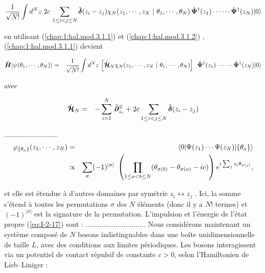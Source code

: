 {{\begin{eqnarray}
	 \frac{1}{ \sqrt{N!}} \int d^N z \,  \,2	c \,\sum_{1\leq i<j\leq N} \hat{\bm{\delta}}(z_i - z_j) \chi_N ( z_1 , \cdots , z_N  ~\vert ~ \theta_1 , \cdots , \theta _N ) \, \hat{\bm{\Psi}}^\dag(z_1) \cdots  \cdots\hat{\bm{\Psi}}^\dag(z_N) \vert 0 \rangle \label{chap:1:hal.mod.3.1.2}	
\end{eqnarray} 

en utilisant (\ref{chap:1:hal.mod.3.1.1}) et (\ref{chap:1:hal.mod.3.1.2}) , (\ref{chap:1:hal.mod.3.1.1}) devient 

\begin{eqnarray}
	\operator{H}\vert \psi ( \theta_1 , \cdots , \theta_N ) \rangle &= &  \frac{1}{ \sqrt{N!}} \int d^N z \,  	\left [ \operator{\mathcal{H}}_N \chi_N ( z_1 , \cdots , z_N  ~\vert ~ \theta_1 , \cdots , \theta _N ) \right ] \, \operator{\Psi}^\dag(z_1) \cdots  \cdots\operator{\Psi}^\dag(z_N) \vert 0 \rangle		
\end{eqnarray}

avec 

\begin{eqnarray}
	\hat{\bm{\mathcal{H}}}_N & = &  - \sum_{i=1}^N \, \hat{\bm{\partial}}_{z_i}^2 + 2	c \sum_{1\leq i<j\leq N} \hat{\bm{\delta}}(z_i - z_j) 		
\end{eqnarray}


...........................
\begin{eqnarray}
	\varphi_{\{\theta_a\}} ( z_1 , \cdots , z_N ) & = & \langle 0 \vert \Psi ( z_1 ) \cdots \Psi (z_N ) \vert \{ \theta_a \} \rangle \notag\\
	& \propto & \sum_\sigma ( - 1 ) ^{ \vert \sigma \vert } \left ( \prod_{ 1 \leq a < b \leq N } ( \theta_{\sigma(b)} - \theta_{\sigma(a)} - ic ) \right ) e^{i \sum_j z_i \theta_{ \sigma(j)}}\label{eq:I-2-17},
\end{eqnarray}

et elle est étendue à d'autres domaines par symétrie $z_i \leftrightarrow z_j$ . Ici, la somme s'étend à toutes les permutations $\sigma$ des $N$ éléments (donc il y a $N!$ termes) et $(-1)^{|\sigma|}$ est la signature de la permutation. L'impulsion et l'énergie de l'état propre (\ref{eq:I-2-17}) sont :
..............................
Nous considérons maintenant un système composé de \(N\) bosons indistinguables dans une boîte unidimensionnelle de taille \(L\), avec des conditions aux limites périodiques. Les bosons interagissent via un potentiel de contact répulsif de constante \(c > 0\), selon l’Hamiltonien de Lieb–Liniger :

}}
